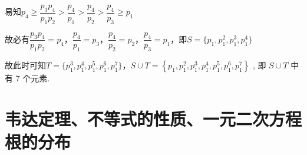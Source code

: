 \begin{enumerate}
\begin{jieda}
        易知$p_4 \geq \dfrac{p_3p_4}{p_1p_2} > \dfrac{p_4}{p_1}>\dfrac{p_4}{p_2} > \dfrac{p_4}{p_3} \geq p_1$

        故必有$\dfrac{p_3p_4}{p_1p_2} = p_4$，$ \dfrac{p_4}{p_1} = p_3$，$\dfrac{p_4}{p_2} = p_2$，$\dfrac{p_4}{p_3} = p_1$，即$S = \{p_1, p_1^2, p_1^3, p_1^4\}$

        故此时可知$T = \{p_1^3, p_1^4, p_1^5, p_1^6, p_1^7\}$，$S \cup  T = \left\{  {{p}_{1},{p}_{1}^{2},{p}_{1}^{3},{p}_{1}^{4},{p}_{1}^{5},{p}_{1}^{6},{p}_{1}^{7}}\right\}$ , 即 $S \cup  T$ 中有 7 个元素.
    \end{jieda} 
\end{enumerate}
\section*{韦达定理、不等式的性质、一元二次方程根的分布}
